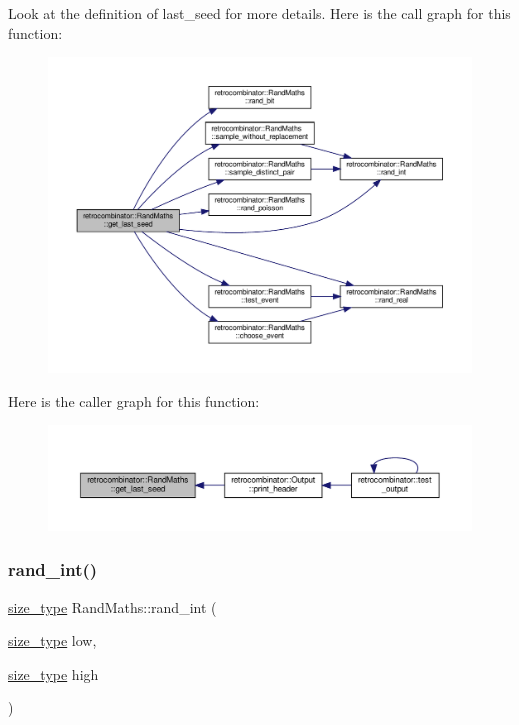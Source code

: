 Look at the definition of last\+\_\+seed for more details. Here is the call graph for this function\+:
\nopagebreak
\begin{figure}[H]
\begin{center}
\leavevmode
\includegraphics[width=350pt]{classretrocombinator_1_1RandMaths_ae3a186a8f3124cbfc698eeae09b708a0_cgraph}
\end{center}
\end{figure}
Here is the caller graph for this function\+:
\nopagebreak
\begin{figure}[H]
\begin{center}
\leavevmode
\includegraphics[width=350pt]{classretrocombinator_1_1RandMaths_ae3a186a8f3124cbfc698eeae09b708a0_icgraph}
\end{center}
\end{figure}
\mbox{\label{classretrocombinator_1_1RandMaths_a8072bad64e64ef042e5257e1bee85635}} 
\subsubsection{\texorpdfstring{rand\+\_\+int()}{rand\_int()}}
{\footnotesize\ttfamily \hyperlink{constants_8h_a8e1541b50cee66a791df4c437ccbb385}{size\+\_\+type} Rand\+Maths\+::rand\+\_\+int (\begin{DoxyParamCaption}\item[{\hyperlink{constants_8h_a8e1541b50cee66a791df4c437ccbb385}{size\+\_\+type}}]{low,  }\item[{\hyperlink{constants_8h_a8e1541b50cee66a791df4c437ccbb385}{size\+\_\+type}}]{high }\end{DoxyParamCaption})}



